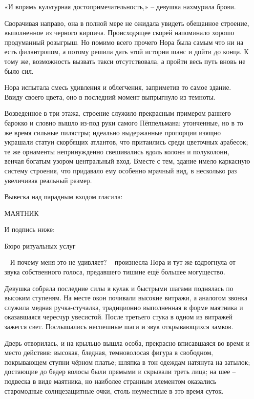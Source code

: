\documentclass[
  a5paperpaper,
  DIV=11,
  numbers=noendperiod]{scrreprt}
\begin{document}
«И впрямь культурная достопримечательность,» -- девушка нахмурила брови.

Сворачивая направо, она в полной мере не ожидала увидеть обещанное
строение, выполненное из черного кирпича. Происходящее скорей напоминало
хорошо продуманный розыгрыш. Но помимо всего прочего Нора была самым что
ни на есть филантропом, а потому решила дать этой истории шанс и дойти
до конца. К тому же, возможность вызвать такси отсутствовала, а пройти
весь путь вновь не было сил.

Нора испытала смесь удивления и облегчения, заприметив то самое здание.
Ввиду своего цвета, оно в последний момент выпрыгнуло из темноты.

Возведенное в три этажа, строение служило прекрасным примером раннего
барокко и словно вышло из-под руки самого Пёппельмана: утонченные, но в
то же время сильные пилястры; идеально выдержанные пропорции изящно
украшали статуи скорбящих атлантов, что притаились среди цветочных
арабесок; те же орнаменты непринужденно свешивались вдоль колонн и
полуколонн, венчая богатым узором центральный вход. Вместе с тем, здание
имело каркасную систему строения, что придавало ему особенно мрачный
вид, в несколько раз увеличивая реальный размер.

Вывеска над парадным входом гласила:

МАЯТНИК

И подпись ниже:

Бюро ритуальных услуг

-- И почему меня это не удивляет? -- произнесла Нора и тут же вздрогнула
от звука собственного голоса, предавшего тишине ещё большее могущество.

Девушка собрала последние силы в кулак и быстрыми шагами поднялась по
высоким ступеням. На месте окон почивали высокие витражи, а аналогом
звонка служила медная ручка-стучалка, традиционно выполненная в форме
маятника и оказавшаяся чересчур увесистой. После третьего стука в одном
из витражей зажегся свет. Послышались неспешные шаги и звук
открывающихся замков.

Дверь отворилась, и на крыльцо вышла особа, прекрасно вписавшаяся во
время и место действия: высокая, бледная, темноволосая фигура в
свободном, покрывающем ступни чёрном платье; шляпка в тон одеждам
натянута на затылок; достающие до бедер волосы были прямыми и скрывали
треть лица; на шее -- подвеска в виде маятника, но наиболее странным
элементом оказались старомодные солнцезащитные очки, столь неуместные в
это время суток.
\end{document}
